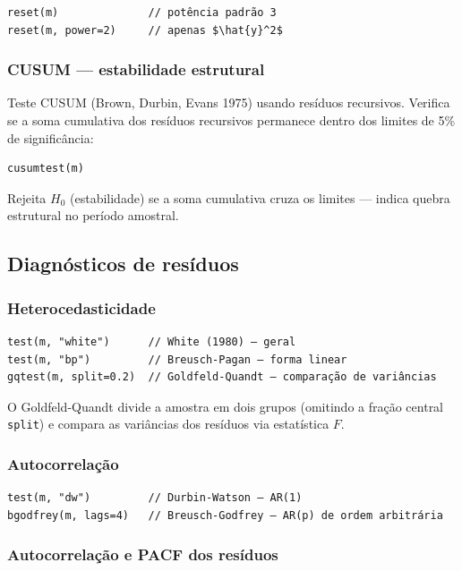 \begin{lstlisting}
reset(m)              // potência padrão 3
reset(m, power=2)     // apenas $\hat{y}^2$
\end{lstlisting}

\subsubsection*{CUSUM — estabilidade estrutural}

Teste CUSUM (Brown, Durbin, Evans 1975) usando resíduos recursivos. Verifica
se a soma cumulativa dos resíduos recursivos permanece dentro dos limites de
5\% de significância:

\begin{lstlisting}
cusumtest(m)
\end{lstlisting}

Rejeita $H_0$ (estabilidade) se a soma cumulativa cruza os limites — indica
quebra estrutural no período amostral.

\subsection{Diagnósticos de resíduos}

\subsubsection*{Heterocedasticidade}

\begin{lstlisting}
test(m, "white")      // White (1980) — geral
test(m, "bp")         // Breusch-Pagan — forma linear
gqtest(m, split=0.2)  // Goldfeld-Quandt — comparação de variâncias
\end{lstlisting}

O Goldfeld-Quandt divide a amostra em dois grupos (omitindo a fração central
\texttt{split}) e compara as variâncias dos resíduos via estatística $F$.

\subsubsection*{Autocorrelação}

\begin{lstlisting}
test(m, "dw")         // Durbin-Watson — AR(1)
bgodfrey(m, lags=4)   // Breusch-Godfrey — AR(p) de ordem arbitrária
\end{lstlisting}

\subsubsection*{Autocorrelação e PACF dos resíduos}


